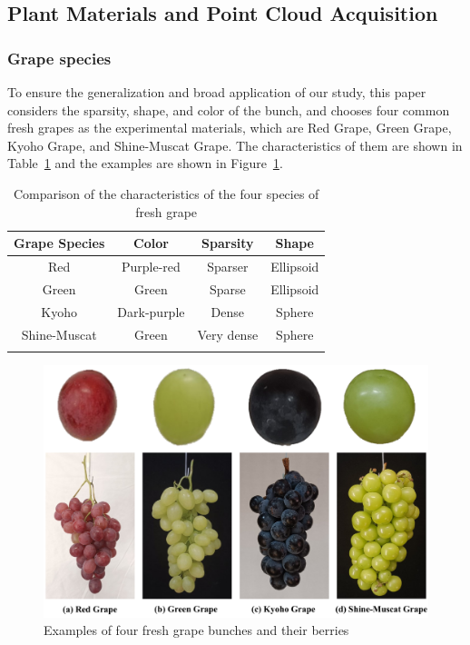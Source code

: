 \documentclass[12pt]{article}
\begin{document}
\subsection{Plant Materials and Point Cloud Acquisition}

\subsubsection{Grape species}

To ensure the generalization and broad application of our study, this paper considers the sparsity, shape, and color of the bunch, and chooses four common fresh grapes as the experimental materials, which are Red Grape, Green Grape, Kyoho Grape, and Shine-Muscat Grape. 
The characteristics of them are shown in Table~\ref{tbl:1} and the examples are shown in Figure~\ref{fig:raw86}.

\begin{table}[h]
    \centering
    \caption{Comparison of the characteristics of the four species of fresh grape}
    \begin{tabular}{cccc}
        \hline
        \textbf{Grape Species} & \textbf{Color} & \textbf{Sparsity} & \textbf{Shape} \\
        \hline
        Red & Purple-red & Sparser & Ellipsoid \\
        Green & Green & Sparse & Ellipsoid \\
        Kyoho & Dark-purple & Dense & Sphere \\
        Shine-Muscat & Green & Very dense & Sphere \\
        \hline
    \label{tbl:1}
    \end{tabular}
\end{table}

\begin{figure}[hbt!]
    \centering
    \includegraphics[width=1\textwidth]{figures/Figure2.pdf}
    \caption{Examples of four fresh grape bunches and their berries}
    \label{fig:raw86}
\end{figure}
\end{document}
